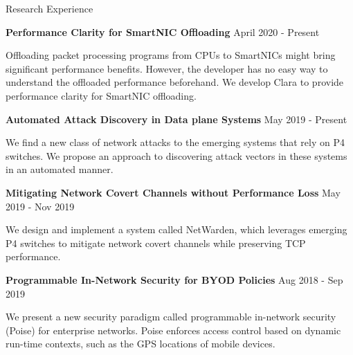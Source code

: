 \documentclass{resume} %
\begin{document}


\begin{rSection}{Research Experience}

\item {\bf Performance Clarity for SmartNIC Offloading} \hfill { April 2020 - Present}

Offloading packet processing programs from CPUs to SmartNICs might bring significant performance benefits.
However, the developer has no easy way to understand the offloaded performance beforehand.
We develop Clara to provide performance clarity for SmartNIC offloading.

\item {\bf Automated Attack Discovery in Data plane Systems}    \hfill { May 2019 - Present}

We find a new class of network attacks to the emerging systems that rely on P4 switches.
We propose an approach to discovering attack vectors in these systems in an automated manner.

\item {\bf Mitigating Network Covert Channels without Performance Loss} \hfill { May 2019 - Nov 2019}

We design and implement a system called NetWarden,
which leverages emerging P4 switches to mitigate network covert channels
while preserving TCP performance.

\item {\bf Programmable In-Network Security for BYOD Policies} \hfill { Aug 2018 - Sep 2019}

We present a new security paradigm called programmable in-network security (Poise) for enterprise networks.
Poise enforces access control based on dynamic run-time contexts,
such as the GPS locations of mobile devices.

\end{rSection}
\end{document}
